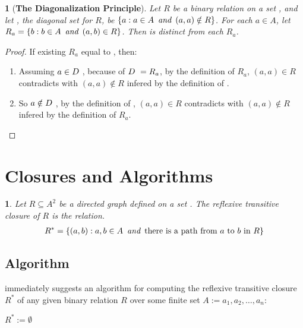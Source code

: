 \newtheorem*{diagonalizationprinciple}{}
\begin{diagonalizationprinciple}[\bf The Diagonalization Principle]
    Let $R$ be a binary relation on a set \ua, and let \ud, the diagonal set for $R$, 
    be $\{a: a\in A \aand (a, a)\notin R\}$. For each $a\in A$, let 
    $R_a = \{b: b\in A \aand (a,b)\in R\}$. Then \ud is distinct from each $R_a$.
\end{diagonalizationprinciple}
\begin{proof}
    If existing $R_a$ equal to \ud, then:
    \begin{enumerate}
        \item Assuming $a\in\ud$, because of $\ud = R_a$, by the definition of $R_a$, $(a, a)\in R$ 
        contradicts with $(a, a)\notin R$ infered by the definition of \ud.
        \item So $a\notin\ud$, by the definition of \ud, $(a, a)\in R$ contradicts with 
        $(a, a)\notin R$ infered by the definition of $R_a$.
    \end{enumerate}
\end{proof}

\section{Closures and Algorithms}

\newtheorem{reflexive-transitive-closure}[theorem_root]{}
\begin{reflexive-transitive-closure}
    \label{def:relative_transitive_closure}
Let $R\subseteq A^2$ be a directed graph defined on a set \ua. The 
reflexive transitive closure of $R$ is the relation.
\begin{align*}
    R^\ast = \{(a,b): a, b\in A \aand \text{there is a path from $a$ to $b$ in $R$}\}
\end{align*}
\end{reflexive-transitive-closure}

\subsection{Algorithm}

 immediately suggests an algorithm for computing
the reflexive transitive closure $R^\ast$ of any given binary relation $R$ over some finite 
set $A := {a_1, a_2,\ldots, a_n}$:
\begin{algorithm}
\begin{algorithmic}[1]
\Init $R^\ast:=\emptyset$\EndInit
{}
\State{}
\EndIf
\EndFor
\EndFor
\end{algorithmic}
\caption{Compute reflexive transitive closure. version 1}
\label{alg:closure_computation_vo}
\end{algorithm}

